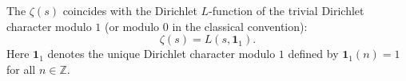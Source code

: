 \begin{corollary} \label{corollary:riemann_zeta_as_principal_dirichlet_L_function}
The  $\zeta(s)$ coincides with the Dirichlet $L$-function of the trivial Dirichlet character modulo $1$ (or modulo $0$ in the classical convention):
\[
\zeta(s) = L(s, \mathbf{1}_1).
\]
Here $\mathbf{1}_1$ denotes the unique Dirichlet character modulo $1$ defined by $\mathbf{1}_1(n) = 1$ for all $n \in \mathbb{Z}$.
\end{corollary}